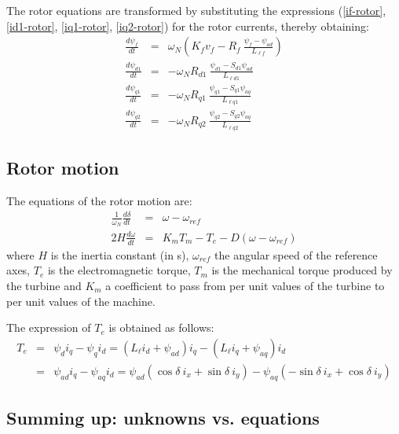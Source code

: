 The rotor equations are transformed by substituting the expressions (\ref{if-rotor}, \ref{id1-rotor}, \ref{iq1-rotor}, \ref{iq2-rotor}) for the rotor currents, thereby obtaining:
\begin{eqnarray}
\frac{d\psi_f}{dt} & = & \omega_N ( K_f v_f - R_f \: \frac{\psi_f - \psi_{ad}}{L_{\ell f}} ) \label{rotor-psif} \\
\frac{d\psi_{d1}}{dt} & = & - \omega_N R_{d1} \: \frac{\psi_{d1} - S_{d1} \psi_{ad}}{L_{\ell d1}} \label{rotor-psid1} \\
\frac{d\psi_{q1}}{dt} & = & - \omega_N R_{q1} \: \frac{\psi_{q1} - S_{q1} \psi_{aq}}{L_{\ell q1}} \label{rotor-psiq1} \\
\frac{d\psi_{q2}}{dt} & = & - \omega_N R_{q2} \: \frac{\psi_{q2} - S_{q2} \psi_{aq}}{L_{\ell q2}} \label{rotor-psiq2}
\end{eqnarray}

\subsection{Rotor motion}

The equations of the rotor motion are:
\begin{eqnarray}
\frac{1}{\omega_N} \frac{d\delta}{dt} & = & \omega - \omega_{ref} \label{rotmot1} \\
2 H \frac{d\omega}{dt} & = & K_m T_m - T_e - D ( \omega - \omega_{ref} ) \label{rotmot2}
\end{eqnarray}
where $H$ is the inertia constant (in s), $\omega_{ref}$ the angular speed of the reference axes, $T_e$ is the electromagnetic torque, $T_m$ is the mechanical torque produced by the turbine and $K_m$ a coefficient to pass from per unit values of the turbine to per unit values of the machine.

The expression of $T_e$ is obtained as follows:
\begin{eqnarray}
T_e & = & \psi_d i_q - \psi_q i_d = ( L_\ell i_d + \psi_{ad} ) i_q - ( L_\ell i_q + \psi_{aq} ) i_d \nonumber \\
& = & \psi_{ad} i_q - \psi_{aq} i_d = \psi_{ad} ( \cos \delta \: i_x + \sin \delta \: i_y ) - \psi_{aq} ( - \sin \delta \: i_x + \cos \delta \: i_y ) \label{torque}
\end{eqnarray}

\subsection{Summing up: unknowns vs. equations}

